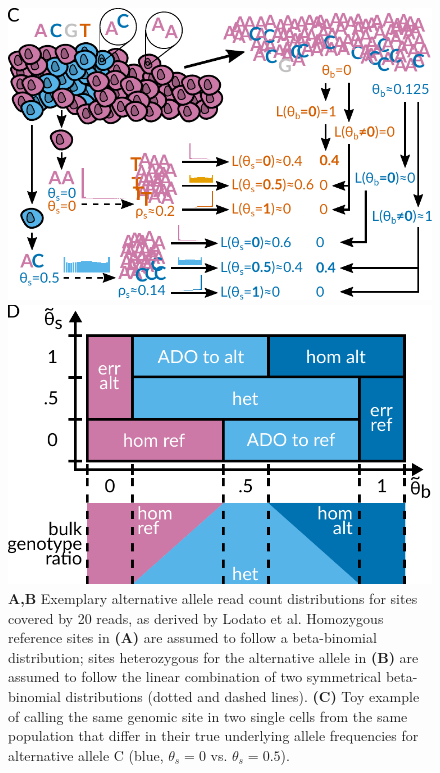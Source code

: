 \documentclass[12pt,inline]{wlscirep}
\begin{document}
\begin{figure}[!tpb]
\begin{minipage}[t]{.99\linewidth}
\begin{minipage}{.47\linewidth}
      \includegraphics[width=.95\linewidth]{figs/prosolo_alt-calling_overview.pdf}
    \end{minipage}
    \hspace{2ex}
    \begin{minipage}{.49\linewidth}
      \includegraphics[width=.95\linewidth]{figs/Event_space.pdf}
    \end{minipage}
  \end{minipage}
  \caption{
   \textbf{A,B} Exemplary alternative allele read count distributions for sites covered by 20 reads, as derived by Lodato et al.\cite{lodato_somatic_2015}
   Homozygous reference sites in \textbf{(A)} are assumed to follow a beta-binomial distribution;
   sites heterozygous for the alternative allele in \textbf{(B)} are assumed to follow the linear combination of two symmetrical beta-binomial distributions (dotted and dashed lines).
   \textbf{(C)} Toy example of calling the same genomic site in two single cells from the same population that differ in their true underlying allele frequencies for alternative allele C (blue, $\theta_s = 0$ vs. $\theta_s = 0.5$).
}
\end{figure}
\end{document}
